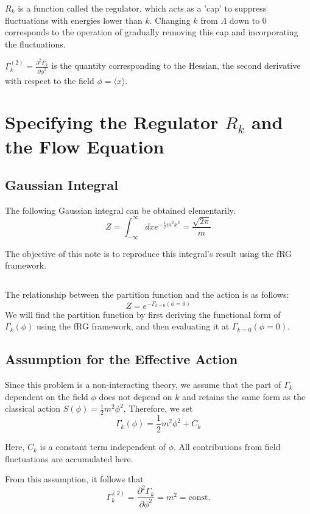 \documentclass[uplatex,a4j,12pt,dvipdfmx]{jsarticle}
\begin{document}
$R_{k}$ is a function called the regulator,
which acts as a 'cap' to suppress fluctuations with energies lower than $k$.
Changing $k$ from $\Lambda$ down to $0$ corresponds to the operation
of gradually removing this cap and incorporating the fluctuations.

$\Gamma^{(2)}_{k} = \frac{\partial^{2} \Gamma_{k}}{\partial \phi^{2}}$
is the quantity corresponding to the Hessian,
the second derivative with respect to the field $\phi = \langle x \rangle$.

\section{Specifying the Regulator $R_{k}$ and the Flow Equation}

\subsection{Gaussian Integral}

The following Gaussian integral can be obtained elementarily.
\[
	Z =
	\int^{\infty}_{- \infty} dx e^{ -\frac{1}{2} m^{2} x^{2} }
	=
	\frac{ \sqrt{2 \pi} }{ m }
\]

The objective of this note is to reproduce this integral's result using the fRG framework.

${}$

The relationship between the partition function and the action is as follows:
\[
	Z = e^{-\Gamma_{k=0}(\phi=0)}
\]
We will find the partition function by first deriving the functional form of $\Gamma_{k} (\phi)$
using the fRG framework, and then evaluating it at $\Gamma_{k=0}(\phi=0)$.

\subsection{Assumption for the Effective Action}

Since this problem is a non-interacting theory,
we assume that the part of $\Gamma_k$ dependent on the field $\phi$ does not depend on $k$
and retains the same form as the classical action $S(\phi)=\frac{1}{2} m^{2} \phi^{2}$.
Therefore, we set
\[
	\Gamma_{k} (\phi) = \frac{1}{2} m^{2} \phi^{2} + C_{k}
\]

Here, $C_k$ is a constant term independent of $\phi$.
All contributions from field fluctuations are accumulated here.

From this assumption, it follows that
\[
	\Gamma^{(2)}_{k}
	=
	\frac{\partial^{2} \Gamma_{k}}{\partial \phi^{2}}
	=
	m^{2}
	=
	\mathrm{const.}
\]
\end{document}
